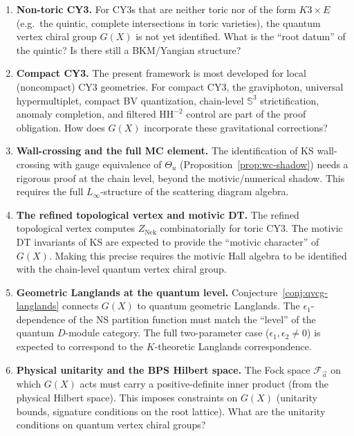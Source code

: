 \documentclass[11pt]{article}
\theoremstyle{definition}
\theoremstyle{remark}
\newcommand{\cF}{\mathcal{F}}
\newcommand{\HH}{\mathrm{HH}}
\newcommand{\Nek}{\mathrm{Nek}}
\begin{document}
\begin{enumerate}[label=\textbf{OP\arabic*.}]
 \item \textbf{Non-toric CY3.} For CY3s that are neither toric nor of the form $K3 \times E$
 (e.g.\ the quintic, complete intersections in toric varieties), the quantum vertex chiral group
 $G(X)$ is not yet identified. What is the ``root datum'' of the quintic? Is there still a
 BKM/Yangian structure?
 \item \textbf{Compact CY3.} The present framework is most developed for local (noncompact) CY3
 geometries. For compact CY3, the graviphoton, universal hypermultiplet, compact BV quantization,
 chain-level $\mathbb{S}^3$ strictification, anomaly completion, and filtered $\HH^{-2}$ control
 are part of the proof obligation. How does $G(X)$ incorporate these gravitational corrections?
 \item \textbf{Wall-crossing and the full MC element.} The identification of KS wall-crossing
 with gauge equivalence of $\Theta_u$ (Proposition~\ref{prop:wc-shadow}) needs a rigorous
 proof at the chain level, beyond the motivic/numerical shadow. This requires the full
 $L_\infty$-structure of the scattering diagram algebra.
 \item \textbf{The refined topological vertex and motivic DT.} The refined topological vertex
 computes $Z_{\Nek}$ combinatorially for toric CY3. The motivic DT invariants of KS are expected to
 provide the ``motivic character'' of $G(X)$. Making this precise requires the motivic Hall
 algebra to be identified with the chain-level quantum vertex chiral group.
 \item \textbf{Geometric Langlands at the quantum level.} Conjecture~\ref{conj:qvcg-langlands}
 connects $G(X)$ to quantum geometric Langlands. The $\epsilon_1$-dependence of
 the NS partition function must match the ``level'' of the quantum $D$-module category.
 The full two-parameter case ($\epsilon_1, \epsilon_2 \neq 0$) is expected to correspond to the
 $K$-theoretic Langlands correspondence.
 \item \textbf{Physical unitarity and the BPS Hilbert space.} The Fock space $\cF_{\vec{a}}$
 on which $G(X)$ acts must carry a positive-definite inner product (from the physical Hilbert
 space). This imposes constraints on $G(X)$ (unitarity bounds, signature conditions on the root
 lattice). What are the unitarity conditions on quantum vertex chiral groups?
\end{enumerate}
\end{document}
